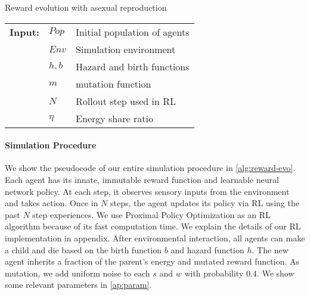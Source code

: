 \begin{algorithm}
  \caption{Reward evolution with asexual reproduction}\label{alg:reward-evo}
  \begin{tabular}{lll}
    \textbf{Input:} & $Pop$ & Initial population of agents \\
                    & $Env$ & Simulation environment \\
                    & $h, b$ & Hazard and birth functions \\
                    & $m$ & mutation function \\
                    & $N$ & Rollout step used in RL \\
                    & $\eta$ & Energy share ratio
  \end{tabular}
  \begin{algorithmic}[1]
    \Loop{}
      \EndOnce{}
    \EndFor{}
       
      \EndWith{}
       
      \EndWith{}
    \EndFor{}
  \EndLoop{}
\end{algorithmic}
\end{algorithm}

\paragraph{Simulation Procedure}
We show the pseudocode of our entire simulation procedure in \cref{alg:reward-evo}. Each agent has its innate, immutable reward function and learnable neural network policy. At each step, it observes sensory inputs from the environment and takes action. Once in $N$ steps, the agent updates its policy via RL using the past $N$ step experiences. We use Proximal Policy Optimization \citep{schulmanProximalPolicyOptimization2017} as an RL algorithm because of its fast computation time. We explain the details of our RL implementation in appendix. After environmental interaction, all agents can make a child and die based on the birth function $b$ and hazard function $h$. The new agent inherits a fraction of the parent's energy and mutated reward function. As mutation, we add uniform noise to each $s$ and $w$ with probability $0.4$. We show some relevant parameters in \cref{ap:param}.

